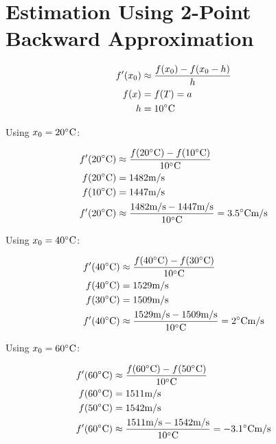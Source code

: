 \section{Estimation Using 2-Point Backward Approximation}
	\begin{align}
		f'(x_{0})&\approx \frac{f(x_{0})-f(x_{0}-h)}{h}& \\
		f(x) &= f(T) = a& \\
		h &= 10 \degree \text{C}&
	\end{align}

	Using $x_{0} = 20 \degree \text{C}$:

	\begin{align}
		f'(20\degree \text{C})&\approx \frac{f(20\degree \text{C})-f(10\degree \text{C})}{10\degree \text{C}}& \\
		f(20\degree \text{C}) &= 1482 \text{m/s}&\\
		f(10\degree \text{C}) &= 1447 \text{m/s}& \\
		f'(20\degree \text{C})&\approx \frac{1482 \text{m/s} - 1447 \text{m/s} }{10 \degree \text{C}} = 3.5\degree \text{C}\text{m/s}&
	\end{align}

	Using $x_{0} = 40 \degree \text{C}$:

	\begin{align}
		f'(40\degree \text{C})&\approx \frac{f(40\degree \text{C})-f(30\degree \text{C})}{10\degree \text{C}}& \\
		f(40\degree \text{C}) &= 1529 \text{m/s}& \\
		f(30\degree \text{C}) &= 1509 \text{m/s}& \\
		f'(40\degree \text{C})&\approx \frac{1529 \text{m/s} - 1509 \text{m/s} }{10\degree \text{C}} = 2\degree \text{C}\text{m/s}&
	\end{align}

	Using $x_{0} = 60 \degree \text{C}$:

	\begin{align}
		f'(60\degree \text{C})&\approx \frac{f(60\degree \text{C})-f(50\degree \text{C})}{10\degree \text{C}}& \\
		f(60\degree \text{C}) &= 1511 \text{m/s}& \\
		f(50\degree \text{C}) &= 1542 \text{m/s}& \\
		f'(60\degree \text{C})&\approx \frac{1511 \text{m/s}- 1542 \text{m/s} }{10\degree \text{C}} = -3.1\degree \text{C}\text{m/s}&
	\end{align}

